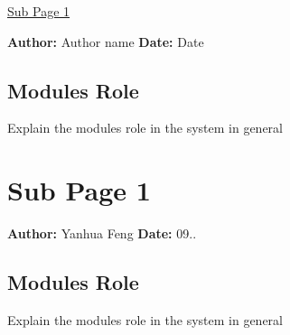 \hyperlink{Subpage_1}{Sub Page 1}

{\bfseries Author\+:} Author name {\bfseries Date\+:} Date \subsection*{Module\textquotesingle{}s Role}

Explain the module\textquotesingle{}s role in the system in general \hypertarget{Subpage_1}{}\section{Sub Page 1}\label{Subpage_1}
{\bfseries Author\+:} Yanhua Feng {\bfseries Date\+:} 09.. \subsection*{Module\textquotesingle{}s Role}

Explain the module\textquotesingle{}s role in the system in general 